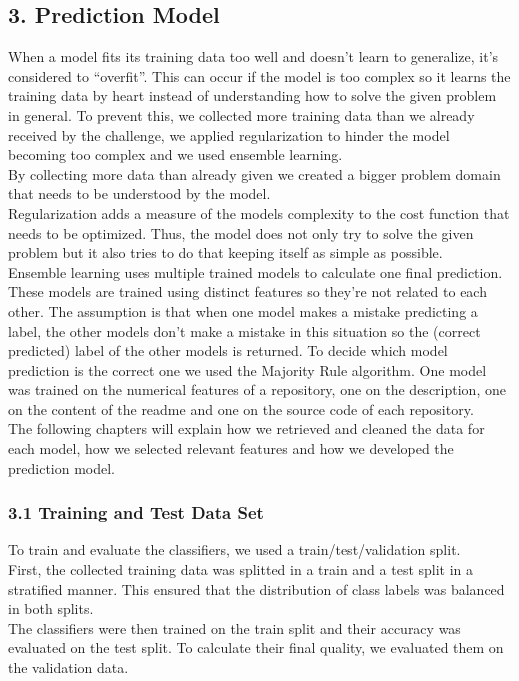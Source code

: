 \documentclass{article}
\begin{document}
\subsection{3. Prediction Model}\label{prediction-model}

When a model fits its training data too well and doesn't learn to
generalize, it's considered to ``overfit''. This can occur if the model
is too complex so it learns the training data by heart instead of
understanding how to solve the given problem in general. To prevent
this, we collected more training data than we already received by the
challenge, we applied regularization to hinder the model becoming too
complex and we used ensemble learning.\\
By collecting more data than already given we created a bigger problem
domain that needs to be understood by the model.\\
Regularization adds a measure of the models complexity to the cost
function that needs to be optimized. Thus, the model does not only try
to solve the given problem but it also tries to do that keeping itself
as simple as possible.\\
Ensemble learning uses multiple trained models to calculate one final
prediction. These models are trained using distinct features so they're
not related to each other. The assumption is that when one model makes a
mistake predicting a label, the other models don't make a mistake in
this situation so the (correct predicted) label of the other models is
returned. To decide which model prediction is the correct one we used
the Majority Rule algorithm. One model was trained on the numerical
features of a repository, one on the description, one on the content of
the readme and one on the source code of each repository.\\
The following chapters will explain how we retrieved and cleaned the
data for each model, how we selected relevant features and how we
developed the prediction model.

\subsubsection{3.1 Training and Test Data
Set}\label{training-and-test-data-set}

To train and evaluate the classifiers, we used a train/test/validation
split.\\
First, the collected training data was splitted in a train and a test
split in a stratified manner. This ensured that the distribution of
class labels was balanced in both splits.\\
The classifiers were then trained on the train split and their accuracy
was evaluated on the test split. To calculate their final quality, we
evaluated them on the validation data.
\end{document}
